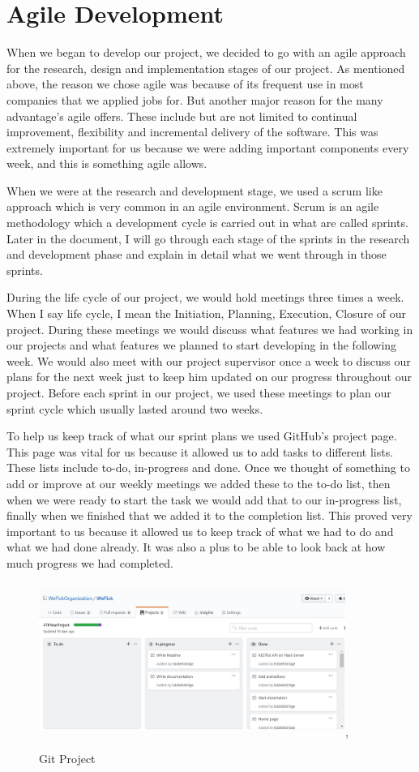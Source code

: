 \section{Agile Development}
When we began to develop our project, we decided to go with an agile approach for the research, design and implementation stages of our project. As mentioned above, the reason we chose agile was because of its frequent use in most companies that we applied jobs for. But another major reason for the many advantage’s agile offers. These include but are not limited to continual improvement, flexibility and incremental delivery of the software. This was extremely important for us because we were adding important components every week, and this is something agile allows.
\par
When we were at the research and development stage, we used a scrum like approach which is very common in an agile environment. Scrum is an agile methodology which a development cycle is carried out in what are called sprints. Later in the document, I will go through each stage of the sprints in the research and development phase and explain in detail what we went through in those sprints.
\par
During the life cycle of our project, we would hold meetings three times a week. When I say life cycle, I mean the Initiation, Planning, Execution, Closure of our project. During these meetings we would discuss what features we had working in our projects and what features we planned to start developing in the following week. We would also meet with our project supervisor once a week to discuss our plans for the next week just to keep him updated on our progress throughout our project. Before each sprint in our project, we used these meetings to plan our sprint cycle which usually lasted around two weeks. 
\par
To help us keep track of what our sprint plans we used GitHub’s project page. This page was vital for us because it allowed us to add tasks to different lists. These lists include to-do, in-progress and done. Once we thought of something to add or improve at our weekly meetings we added these to the to-do list, then when we were ready to start the task we would add that to our in-progress list, finally when we finished that we added it to the completion list. This proved very important to us because it allowed us to keep track of what we had to do and what we had done already. It was also a plus to be able to look back at how much progress we had completed.
\begin{figure}[ht]
\renewcommand\thefigure{3.1}
\centering
\includegraphics[width=10cm, height=5cm]{img/projectboard.JPG},
\caption{Git Project}
\label{Github Projects}
\end{figure}
